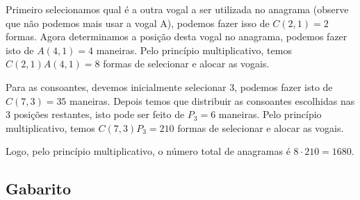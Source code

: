 \documentclass[a4paper, 12pt, addpoints]{exam}
\begin{document}
\begin{questions}
\begin{resp}
\begin{enumerate}[a)]
    Primeiro selecionamos qual é a outra vogal a ser utilizada no anagrama (observe que não podemos mais usar a vogal A), podemos fazer isso de $C(2,1) = 2$ formas. Agora determinamos a posição desta vogal no anagrama, podemos fazer isto de $A(4,1) = 4$ maneiras. Pelo princípio multiplicativo, temos $C(2,1)A(4,1) = 8$ formas de selecionar e alocar as vogais.
    
    Para as consoantes, devemos inicialmente selecionar 3, podemos fazer isto de $C(7,3) = 35$ maneiras. Depois temos que distribuir as consoantes escolhidas nas 3 posições restantes, isto pode ser feito de $P_3 = 6$ maneiras. Pelo princípio multiplicativo, temos $C(7,3)P_3 = 210$ formas de selecionar e alocar as vogais.
    
    Logo, pelo princípio multiplicativo, o número total de anagramas é $8\cdot210 = 1680$.
    
  \end{enumerate}
\end{resp}


\end{questions}

\newpage

\vspace{1cm}
\begin{center}
  \section*{Gabarito}
\end{center}
\end{document}
